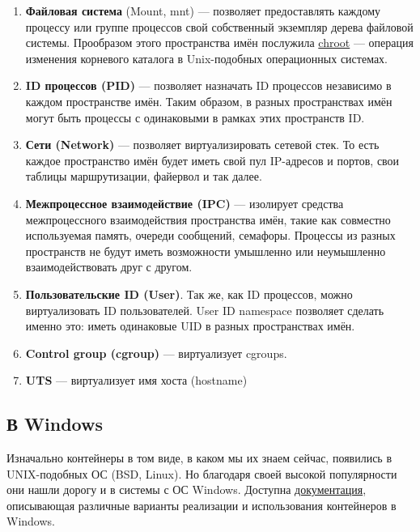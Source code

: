 \documentclass[14pt, a4paper]{article}
\begin{document}
\begin{enumerate}
    \item \textbf{Файловая система} (Mount, mnt) — позволяет предоставлять каждому процессу или группе
    процессов свой собственный экземпляр дерева файловой системы. Прообразом этого
    пространства имён послужила \href{https://ru.wikipedia.org/wiki/Chroot}{chroot} — операция изменения корневого каталога в
    Unix-подобных операционных системах.
    \item \textbf{ID процессов (PID)} — позволяет назначать ID процессов независимо в каждом пространстве
    имён. Таким образом, в разных пространствах имён могут быть процессы с одинаковыми в
    рамках этих пространств ID.
    \item \textbf{Сети (Network)} — позволяет виртуализировать сетевой стек. То есть каждое пространство
    имён будет иметь свой пул IP-адресов и портов, свои таблицы маршрутизации, файервол и так
    далее.
    \item \textbf{Межпроцессное взаимодействие (IPC)} — изолирует средства межпроцессного
    взаимодействия пространства имён, такие как совместно используемая память, очереди
    сообщений, семафоры. Процессы из разных пространств не будут иметь возможности
    умышленно или неумышленно взаимодействовать друг с другом.
    \item \textbf{Пользовательские ID (User)}. Так же, как ID процессов, можно виртуализовать ID
    пользователей. User ID namespace позволяет сделать именно это: иметь одинаковые UID в
    разных пространствах имён.
    \item \textbf{Control group (cgroup)} — виртуализует cgroups.
    \item \textbf{UTS} — виртуализует имя хоста (hostname)\\
\end{enumerate}

\subsection*{В Windows}

Изначально контейнеры в том виде, в каком мы их знаем сейчас, появились в UNIX-подобных ОС
(BSD, Linux). Но благодаря своей высокой популярности они нашли дорогу и в системы с ОС Windows.
Доступна \href{https://docs.microsoft.com/en-us/virtualization/windowscontainers/}{документация}, описывающая различные варианты реализации и использования
контейнеров в Windows.
\end{document}
